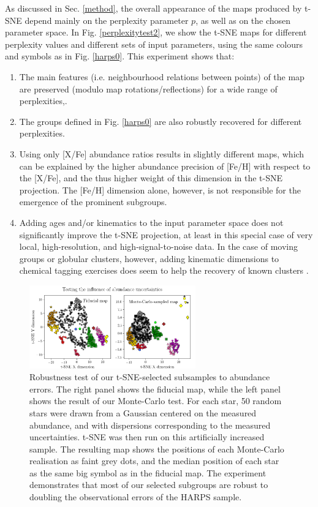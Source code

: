 \documentclass{aa}  %
\begin{document}
As discussed in Sec. \ref{method}, the overall appearance of the maps produced by t-SNE depend mainly on the perplexity parameter $p$, as well as on the chosen parameter space. In Fig. \ref{perplexitytest2}, we show the t-SNE maps for different perplexity values and different sets of input parameters, using the same colours and symbols as in Fig. \ref{harps0}. This experiment shows that: 
\begin{enumerate}
 \item The main features (i.e. neighbourhood relations between points) of the map are preserved (modulo map rotations/reflections) for a wide range of perplexities,.
 \item The groups defined in Fig. \ref{harps0} are also robustly recovered for different perplexities.
 \item Using only [X/Fe] abundance ratios results in slightly different maps, which can be explained by the higher abundance precision of [Fe/H] with respect to the [X/Fe], and the thus higher weight of this dimension in the t-SNE projection. The [Fe/H] dimension alone, however, is not responsible for the emergence of the prominent subgroups.
 \item Adding ages and/or kinematics to the input parameter space does not significantly improve the t-SNE projection, at least in this special case of very local, high-resolution, and high-signal-to-noise data. %
 In the case of moving groups or globular clusters, however, adding kinematic dimensions to chemical tagging exercises does seem to help the recovery of known clusters \citep{Chen2017}.
\end{enumerate}

\begin{figure}%
\sidecaption
 \includegraphics[width=0.64\textwidth]{im/harps_tsne-mctest_teffcut.png}
\caption{Robustness test of our t-SNE-selected subsamples to abundance errors. The right panel shows the fiducial map, while the left panel shows the result of our Monte-Carlo test. For each star, 50 random stars were drawn from a Gaussian centered on the measured abundance, and with dispersions corresponding to the measured uncertainties. t-SNE was then run on this artificially increased sample. The resulting map shows the positions of each Monte-Carlo realisation as faint grey dots, and the median position of each star as the same big symbol as in the fiducial map. The experiment demonstrates that most of our selected subgroups are robust to doubling the observational errors of the HARPS sample.}
\label{mctest}
\end{figure}
\end{document}
